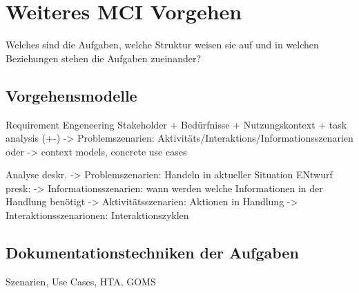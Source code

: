 
\section{Weiteres MCI Vorgehen}

Welches sind die Aufgaben, welche Struktur weisen sie auf und in welchen Beziehungen stehen die Aufgaben zueinander?

\subsection{Vorgehensmodelle}

{\color{blue}Requirement Engeneering
Stakeholder + Bedürfnisse + Nutzungskontext + task analysis (+-)
-> Problemszenarien: Aktivitäts/Interaktions/Informationsszenarien
oder
-> context models, concrete use cases
 
Analyse deskr. -> Problemszenarien: Handeln in aktueller Situation
ENtwurf presk: -> Informationsszenarien: wann werden welche Informationen in der Handlung benötigt
        	       	-> Aktivitätsszenarien: Aktionen in Handlung
                   	-> Interaktionsszenarionen: Interaktionszyklen
 }


\subsection{Dokumentationstechniken der Aufgaben}
 Szenarien, Use Cases, HTA, GOMS

